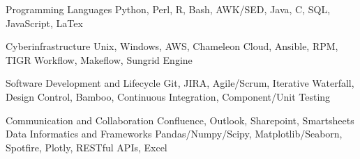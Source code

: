 

\begin{cvskills}

  \cvskill
    {Programming Languages} %
    {Python, Perl, R, Bash, AWK/SED, Java, C, SQL, JavaScript, LaTex} %

  \cvskill
    {Cyberinfrastructure} %
    {Unix, Windows, AWS, Chameleon Cloud, Ansible, RPM, TIGR Workflow, Makeflow, Sungrid Engine} %

  \cvskill
    {Software Development and Lifecycle} %
    {Git, JIRA, Agile/Scrum, Iterative Waterfall, Design Control, Bamboo, Continuous Integration, Component/Unit Testing} %

    \cvskill
    {Communication and Collaboration}
    {Confluence, Outlook, Sharepoint, Smartsheets}
  \cvskill
    {Data Informatics and Frameworks}
    {Pandas/Numpy/Scipy, Matplotlib/Seaborn, Spotfire, Plotly, RESTful APIs, Excel}






\end{cvskills}
